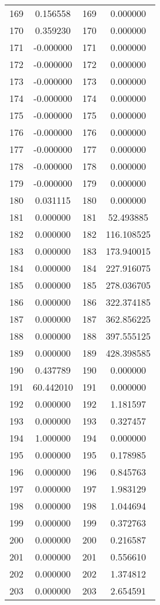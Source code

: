 \documentclass[12pt]{article}
\begin{document}
\begin{longtable}{@{}cccc@{}}
169 & 0.156558 & 169 & 0.000000 \\
170 & 0.359230 & 170 & 0.000000 \\
171 & -0.000000 & 171 & 0.000000 \\
172 & -0.000000 & 172 & 0.000000 \\
173 & -0.000000 & 173 & 0.000000 \\
174 & -0.000000 & 174 & 0.000000 \\
175 & -0.000000 & 175 & 0.000000 \\
176 & -0.000000 & 176 & 0.000000 \\
177 & -0.000000 & 177 & 0.000000 \\
178 & -0.000000 & 178 & 0.000000 \\
179 & -0.000000 & 179 & 0.000000 \\
180 & 0.031115 & 180 & 0.000000 \\
181 & 0.000000 & 181 & 52.493885 \\
182 & 0.000000 & 182 & 116.108525 \\
183 & 0.000000 & 183 & 173.940015 \\
184 & 0.000000 & 184 & 227.916075 \\
185 & 0.000000 & 185 & 278.036705 \\
186 & 0.000000 & 186 & 322.374185 \\
187 & 0.000000 & 187 & 362.856225 \\
188 & 0.000000 & 188 & 397.555125 \\
189 & 0.000000 & 189 & 428.398585 \\
190 & 0.437789 & 190 & 0.000000 \\
191 & 60.442010 & 191 & 0.000000 \\
192 & 0.000000 & 192 & 1.181597 \\
193 & 0.000000 & 193 & 0.327457 \\
194 & 1.000000 & 194 & 0.000000 \\
195 & 0.000000 & 195 & 0.178985 \\
196 & 0.000000 & 196 & 0.845763 \\
197 & 0.000000 & 197 & 1.983129 \\
198 & 0.000000 & 198 & 1.044694 \\
199 & 0.000000 & 199 & 0.372763 \\
200 & 0.000000 & 200 & 0.216587 \\
201 & 0.000000 & 201 & 0.556610 \\
202 & 0.000000 & 202 & 1.374812 \\
203 & 0.000000 & 203 & 2.654591 \\

\end{longtable}
\end{document}
